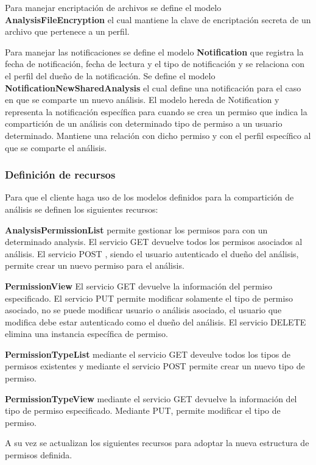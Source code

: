 Para manejar encriptación de archivos se define el modelo \textbf{AnalysisFileEncryption} el cual mantiene la clave de encriptación secreta de un archivo que pertenece a un perfil.

Para manejar las notificaciones se define el modelo \textbf{Notification} que registra la fecha de notificación, fecha de lectura y el tipo de notificación y se relaciona con el perfil del dueño de la notificación. Se define el modelo \textbf{NotificationNewSharedAnalysis} el cual define una notificación para el caso en que se comparte un nuevo análisis. El modelo hereda de Notification y representa la notificación específica para cuando se crea un permiso que indica la compartición de un análisis con determinado tipo de permiso a un usuario determinado. Mantiene una relación con dicho permiso y con el perfil específico al que se comparte el análisis.

\subsubsection{Definición de recursos}

Para que el cliente haga uso de los modelos definidos para la compartición de análisis se definen los siguientes recursos:

\textbf{AnalysisPermissionList} permite gestionar los permisos para con un determinado analysis. El servicio GET devuelve todos los permisos asociados al análisis. El servicio POST , siendo el usuario autenticado el dueño del análisis, permite crear un nuevo permiso para el análisis.

\textbf{PermissionView} El servicio GET devuelve la información del permiso especificado. El servicio PUT permite modificar solamente el tipo de permiso asociado, no se puede modificar usuario o análisis asociado, el usuario que modifica debe estar autenticado como el dueño del análisis. El servicio DELETE elimina una instancia específica de permiso.

\textbf{PermissionTypeList} mediante el servicio GET deveulve todos los tipos de permisos existentes y mediante el servicio POST permite crear un nuevo tipo de permiso.

\textbf{PermissionTypeView} mediante el servicio GET devuelve la información del tipo de permiso especificado. Mediante PUT, permite modificar el tipo de permiso.

A su vez se actualizan los siguientes recursos para adoptar la nueva estructura de permisos definida.

